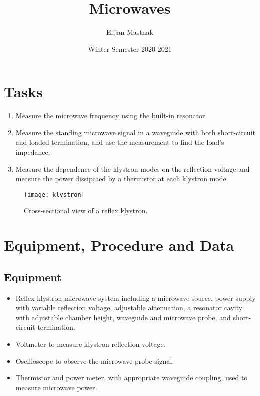\documentclass[11pt, a4paper]{article}
\begin{document}
\title{Microwaves}
\author{Elijan Mastnak}
\date{Winter Semester 2020-2021}
\maketitle
\tableofcontents
		
\section{Tasks}
\begin{enumerate}
	\item Measure the microwave frequency using the built-in resonator
	
	\item Measure the standing microwave signal in a waveguide with both short-circuit and loaded termination, and use the measurement to find the load's impedance.
	
	\item Measure the dependence of the klystron modes on the reflection voltage and measure the power dissipated by a thermistor at each klystron mode.

\end{enumerate}


\begin{figure}
\centering
\texttt{[image: klystron]}
\caption{Cross-sectional view of a reflex klystron.}
\end{figure}

\section{Equipment, Procedure and Data}

\subsection{Equipment}
\begin{itemize}
	\item Reflex klystron microwave system including a microwave source, power supply with variable reflection voltage, adjustable attenuation, a resonator cavity with adjustable chamber height, waveguide and microwave probe, and short-circuit termination.
	
	\item Voltmeter to measure klystron reflection voltage.
	
	\item Oscilloscope to observe the microwave probe signal. 
	
	\item Thermistor and power meter, with appropriate waveguide coupling, used to measure microwave power.
\end{itemize}
\end{document}
